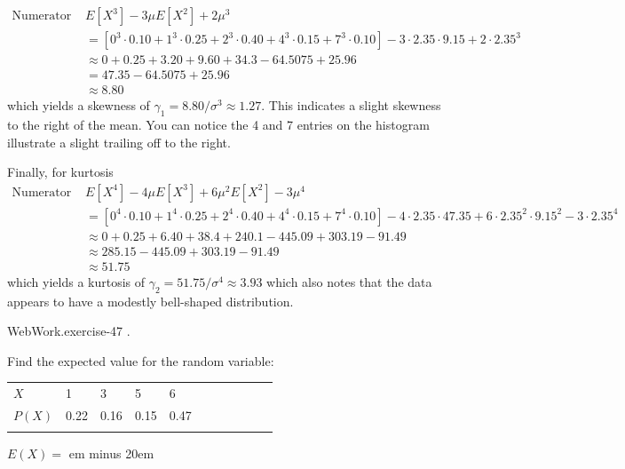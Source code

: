 \documentclass[10pt,]{book}
\newcommand{\fillin}[1]{\leavevmode\leaders\vrule height -1.2pt depth 1.5pt \hskip #1em minus #1em \null}
\numberwithin{equation}{section}
\newcommand{\hrulemedium}{\noalign{\hrule height 0.07em}}
\begin{document}
\begin{align*}
\text{Numerator = } & E[X^3] - 3 \mu E[X^2] + 2\mu^3\\
& = \left [ 0^3 \cdot 0.10 + 1^3 \cdot 0.25 + 2^3 \cdot 0.40 + 4^3 \cdot 0.15 + 7^3 \cdot 0.10 \right ] - 3 \cdot 2.35 \cdot 9.15 + 2 \cdot 2.35^3\\
& \approx 0 + 0.25 + 3.20 + 9.60 + 34.3 - 64.5075 + 25.96\\
& = 47.35 - 64.5075 + 25.96\\
& \approx 8.80
\end{align*}
which yields a skewness of \(\gamma_1 = 8.80 / \sigma^3 \approx 1.27 \). This indicates a slight skewness to the right of the mean. You can notice the 4 and 7 entries on the histogram illustrate a slight trailing off to the right.%
\par
\hypertarget{p-739}{}%
Finally, for kurtosis%
\begin{align*}
\text{Numerator = } & E[X^4] - 4 \mu E[X^3] + 6 \mu^2 E[X^2] - 3\mu^4\\
& = \left [ 0^4 \cdot 0.10 + 1^4 \cdot 0.25 + 2^4 \cdot 0.40 + 4^4 \cdot 0.15 + 7^4 \cdot 0.10 \right ] - 4 \cdot 2.35 \cdot 47.35 + 6 \cdot 2.35^2 \cdot 9.15^2 - 3 \cdot 2.35^4\\
& \approx 0 + 0.25 + 6.40 + 38.4 + 240.1 - 445.09 + 303.19 - 91.49\\
& \approx 285.15 - 445.09 + 303.19 - 91.49\\
& \approx 51.75
\end{align*}
which yields a kurtosis of \(\gamma_2 = 51.75 / \sigma^4 \approx 3.93\) which also notes that the data appears to have a modestly bell-shaped distribution.%
\par
\hypertarget{p-740}{}%
\begin{inlineexercise}{WebWork.}{exercise-47}%
\hypertarget{p-741}{}%
.%
\par\medskip
\hypertarget{p-742}{}%
Find the expected value for the random variable:%
\begin{sidebyside}{1}{0}{0}{0}%
\begin{sbspanel}{1}%
{\centering%
\begin{tabular}{BlBlBlBlBlB}\hrulemedium
\(X\)&1&3&5&6\tabularnewline\hrulemedium
\(P(X)\)&0.22&0.16&0.15&0.47\tabularnewline\hrulemedium
\end{tabular}
\par}
\end{sbspanel}%
\end{sidebyside}%
\par
\hypertarget{p-743}{}%
\(E(X) =\)  \fillin{20}%
\end{inlineexercise}
\end{document}
